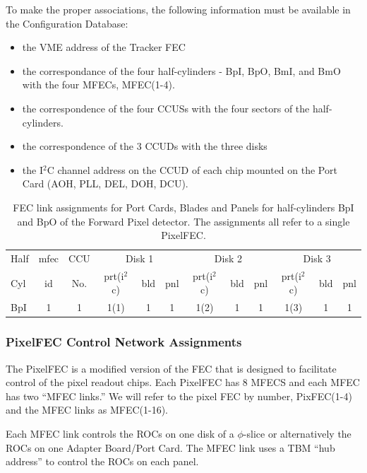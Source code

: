 \documentclass{cmspaper}
\begin{document}
To make the proper associations, the following information must be available in 
the Configuration Database:
\begin{itemize}
\item the VME address of the Tracker FEC
\item the correspondance of the four half-cylinders - BpI, BpO, BmI, and BmO
with the four MFECs, MFEC(1-4).
\item the correspondence of the four CCUSs with the four sectors of the 
half-cylinders.
\item the correspondence of the 3 CCUDs with the three disks
\item the I$^{2}$C channel address on the CCUD
of each chip mounted on the Port Card (AOH, PLL, DEL, DOH, DCU).
\end{itemize}

\begin{table}[htb]
    \caption{FEC link assignments for Port Cards, Blades and Panels for half-cylinders BpI and BpO of the Forward Pixel detector. 
The assignments
all refer to a single PixelFEC.}
    \label{table:trkFEC_Bp}
    \begin{center}
      \begin{tabular}{l|c|c|ccc|ccc|ccc} \hline
Half & mfec &  CCU & \multicolumn{3}{|c|}{Disk 1} & 
\multicolumn{3}{|c}{Disk 2}  &    \multicolumn{3}{|c|}{Disk 3} \\ 
Cyl     & id & No.& prt(i$^{2}$c) & bld & pnl &  prt(i$^{2}$c) & bld & pnl &  
prt(i$^{2}$c) & bld & pnl \\  \hline
BpI & 1 & 1 & 1(1) & 1 & 1 & 1(2)  & 1 & 1 & 1(3)&   1 & 1  \\ \hline
      \end{tabular}
    \end{center}
  \end{table}

\subsubsection{PixelFEC Control Network Assignments}

The PixelFEC is a modified version of the FEC that is designed to 
facilitate control of the pixel readout chips. Each PixelFEC has
8 MFECS and each MFEC has two ``MFEC links.'' We will refer to the 
pixel FEC by number, PixFEC(1-4) and the MFEC links as MFEC(1-16).

Each MFEC link controls the ROCs on one disk of a $\phi$-slice or alternatively
the ROCs on one Adapter Board/Port Card. The MFEC link uses a TBM 
``hub address'' to control the ROCs on each panel.
\end{document}
